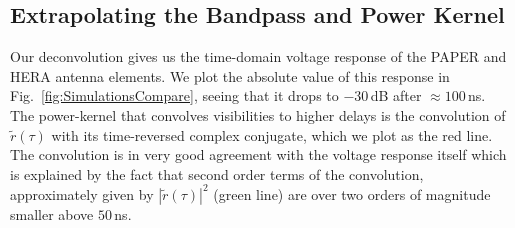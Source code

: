 \documentclass[twocolumn]{emulateapj}
\begin{document}
\subsection{Extrapolating the Bandpass and Power Kernel}
Our deconvolution gives us the time-domain voltage response of the PAPER and HERA antenna elements. We plot the absolute value of this response in Fig.~\ref{fig:SimulationsCompare}, seeing that it drops to $-30$\,dB after $\approx 100$\,ns. The power-kernel that convolves visibilities to higher delays is the convolution of $\widetilde{r}(\tau)$ with its time-reversed complex conjugate, which we plot as the red line. The convolution is in very good agreement with the voltage response itself which is explained by the fact that second order terms of the convolution, approximately given by $|\widetilde{r}(\tau)|^2$ (green line) are over two orders of magnitude smaller above $50$\,ns.
\end{document}
